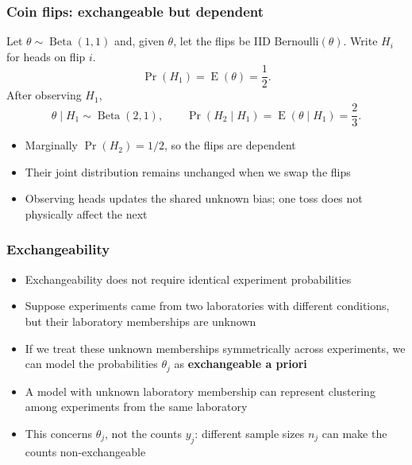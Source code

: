 \documentclass[10pt]{beamer}
\begin{document}
\begin{frame}

\frametitle{Coin flips: exchangeable but dependent}

  Let $\theta\sim\operatorname{Beta}(1,1)$ and, given $\theta$,
  let the flips be IID Bernoulli$(\theta)$.
  Write $H_i$ for heads on flip $i$.
  \[
    \Pr(H_1)=\operatorname{E}(\theta)=\frac12.
  \]
  \pause
  After observing $H_1$,
  \[
    \theta\mid H_1\sim\operatorname{Beta}(2,1),\qquad
    \Pr(H_2\mid H_1)=\operatorname{E}(\theta\mid H_1)=\frac23.
  \]
  \begin{itemize}
  \item Marginally $\Pr(H_2)=1/2$, so the flips are dependent
  \item Their joint distribution remains unchanged when we swap the flips
  \item Observing heads updates the shared unknown bias;
    one toss does not physically affect the next
  \end{itemize}
\end{frame}

\begin{frame}

\frametitle{Exchangeability}

  \begin{itemize}
  \item Exchangeability does not require identical experiment probabilities
  \item Suppose experiments came from two laboratories with different
    conditions, but their laboratory memberships are unknown
  \item If we treat these unknown memberships symmetrically across
    experiments, we can model the probabilities $\theta_j$ as
    \textbf{exchangeable a priori}
  \item A model with unknown laboratory membership can represent
    clustering among experiments from the same laboratory
  \item This concerns $\theta_j$, not the counts $y_j$:
    different sample sizes $n_j$ can make the counts non-exchangeable
  \end{itemize}
\end{frame}
\end{document}
